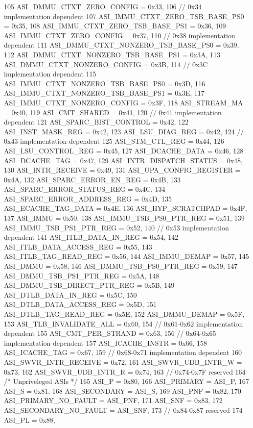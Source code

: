 \begin{DoxyCode}
{105     ASI_DMMU_CTXT_ZERO_CONFIG = 0x33,
106     // 0x34 implementation dependent
107     ASI_IMMU_CTXT_ZERO_TSB_BASE_PS0 = 0x35,
108     ASI_IMMU_CTXT_ZERO_TSB_BASE_PS1 = 0x36,
109     ASI_IMMU_CTXT_ZERO_CONFIG = 0x37,
110     // 0x38 implementation dependent
111     ASI_DMMU_CTXT_NONZERO_TSB_BASE_PS0 = 0x39,
112     ASI_DMMU_CTXT_NONZERO_TSB_BASE_PS1 = 0x3A,
113     ASI_DMMU_CTXT_NONZERO_CONFIG = 0x3B,
114     // 0x3C implementation dependent
115     ASI_IMMU_CTXT_NONZERO_TSB_BASE_PS0 = 0x3D,
116     ASI_IMMU_CTXT_NONZERO_TSB_BASE_PS1 = 0x3E,
117     ASI_IMMU_CTXT_NONZERO_CONFIG = 0x3F,
118     ASI_STREAM_MA = 0x40,
119     ASI_CMT_SHARED = 0x41,
120     // 0x41 implementation dependent
121     ASI_SPARC_BIST_CONTROL = 0x42,
122     ASI_INST_MASK_REG = 0x42,
123     ASI_LSU_DIAG_REG = 0x42,
124     // 0x43 implementation dependent
125     ASI_STM_CTL_REG = 0x44,
126     ASI_LSU_CONTROL_REG = 0x45,
127     ASI_DCACHE_DATA = 0x46,
128     ASI_DCACHE_TAG = 0x47,
129     ASI_INTR_DISPATCH_STATUS = 0x48,
130     ASI_INTR_RECEIVE = 0x49,
131     ASI_UPA_CONFIG_REGISTER = 0x4A,
132     ASI_SPARC_ERROR_EN_REG = 0x4B,
133     ASI_SPARC_ERROR_STATUS_REG = 0x4C,
134     ASI_SPARC_ERROR_ADDRESS_REG = 0x4D,
135     ASI_ECACHE_TAG_DATA = 0x4E,
136     ASI_HYP_SCRATCHPAD = 0x4F,
137     ASI_IMMU = 0x50,
138     ASI_IMMU_TSB_PS0_PTR_REG = 0x51,
139     ASI_IMMU_TSB_PS1_PTR_REG = 0x52,
140     // 0x53 implementation dependent
141     ASI_ITLB_DATA_IN_REG = 0x54,
142     ASI_ITLB_DATA_ACCESS_REG = 0x55,
143     ASI_ITLB_TAG_READ_REG = 0x56,
144     ASI_IMMU_DEMAP = 0x57,
145     ASI_DMMU = 0x58,
146     ASI_DMMU_TSB_PS0_PTR_REG = 0x59,
147     ASI_DMMU_TSB_PS1_PTR_REG = 0x5A,
148     ASI_DMMU_TSB_DIRECT_PTR_REG = 0x5B,
149     ASI_DTLB_DATA_IN_REG = 0x5C,
150     ASI_DTLB_DATA_ACCESS_REG = 0x5D,
151     ASI_DTLB_TAG_READ_REG = 0x5E,
152     ASI_DMMU_DEMAP = 0x5F,
153     ASI_TLB_INVALIDATE_ALL = 0x60,
154     // 0x61-0x62 implementation dependent
155     ASI_CMT_PER_STRAND = 0x63,
156     // 0x64-0x65 implementation dependent
157     ASI_ICACHE_INSTR = 0x66,
158     ASI_ICACHE_TAG = 0x67,
159     // 0x68-0x71 implementation dependent
160     ASI_SWVR_INTR_RECEIVE = 0x72,
161     ASI_SWVR_UDB_INTR_W = 0x73,
162     ASI_SWVR_UDB_INTR_R = 0x74,
163     // 0x74-0x7F reserved
164     /* Unpriveleged ASIs */
165     ASI_P = 0x80,
166     ASI_PRIMARY = ASI_P,
167     ASI_S = 0x81,
168     ASI_SECONDARY = ASI_S,
169     ASI_PNF = 0x82,
170     ASI_PRIMARY_NO_FAULT = ASI_PNF,
171     ASI_SNF = 0x83,
172     ASI_SECONDARY_NO_FAULT = ASI_SNF,
173     // 0x84-0x87 reserved
174     ASI_PL = 0x88,
}
\end{DoxyCode}
